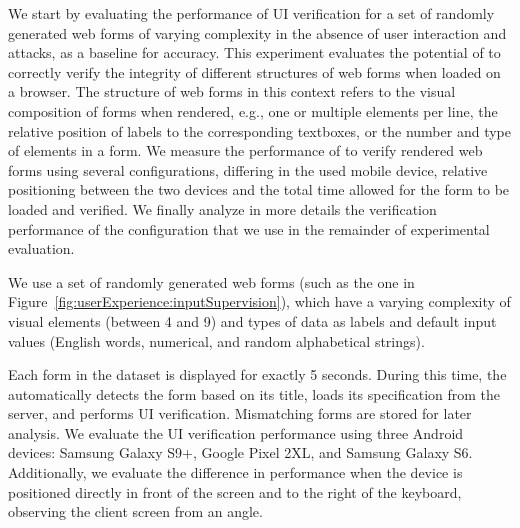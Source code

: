 We start by evaluating the performance of UI verification for a set of randomly generated web forms of varying complexity in the absence of user interaction and attacks, as a baseline for accuracy. 
This experiment evaluates the potential of \sysname to correctly verify the integrity of different structures of web forms when loaded on a browser. The structure of web forms in this context refers to the visual composition of forms when rendered, e.g., one or multiple elements per line, the relative position of labels to the corresponding textboxes, or the number and type of elements in a form.
We measure the performance of \sysname to verify rendered web forms using several configurations, differing in the used mobile device, relative positioning between the two devices and the total time allowed for the form to be loaded and verified.
We finally analyze in more details the verification performance of the configuration that we use in the remainder of experimental evaluation.



We use a set of \numforms randomly generated web forms (such as the one in Figure~\ref{fig:userExperience:inputSupervision}), which have a varying complexity of visual elements (between 4 and 9) and types of data as labels and default input values (English words, numerical, and random alphabetical strings).


Each form in the dataset is displayed for exactly 5 seconds.
During this time, the \app automatically detects the form based on its title, loads its specification from the server, and performs UI verification.
Mismatching forms are stored for later analysis.
We evaluate the UI verification performance using three Android devices: Samsung Galaxy S9+, Google Pixel 2XL, and Samsung Galaxy S6.
Additionally, we evaluate the difference in performance when the device is positioned directly in front of the screen and to the right of the keyboard, observing the client screen from an angle.



